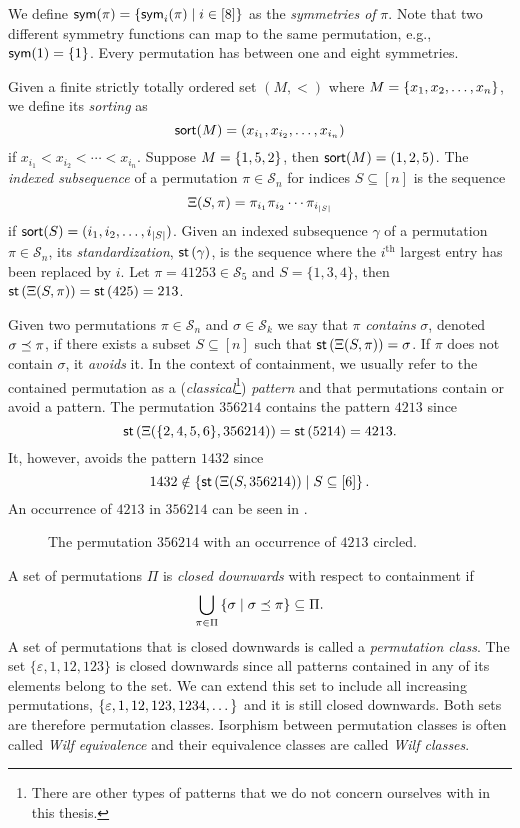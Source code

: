 We define $\textsf{sym}(\pi) = \left\{\textsf{sym}_i(\pi) \mid i \in [8]\right\}$ as the \emph{symmetries of} $\pi$. Note that two different symmetry functions can map to the same permutation, e.g., $\textsf{sym}(1) = \left\{1\right\}$. Every permutation has between one and eight symmetries.

Given a finite strictly totally ordered set $(M, <)$ where $M = \left\{x_1,x_2,\dotsc,x_n\right\}$, we define its \emph{sorting} as
\[
    \textsf{sort}(M) = (x_{i_1},x_{i_2},\dotsc,x_{i_n})
\]
if $x_{i_1} < x_{i_2} < \dotsm < x_{i_n}$. Suppose $M=\left\{1,5,2\right\}$, then $\textsf{sort}(M) = (1,2,5)$. The \emph{indexed subsequence} of a permutation $\pi \in \mathcal{S}_n$ for indices $S\subseteq [n]$ is the sequence
\[
    \Xi(S,\pi)=\pi_{i_1} \pi_{i_2} \dotsm \pi_{i_{|S|}}
\]
if $\textsf{sort}(S) = (i_1,i_2,\dotsc,i_{|S|})$. Given an indexed subsequence $\gamma$ of a permutation $\pi \in \mathcal{S}_n$, its \emph{standardization}, $\textsf{st}\left(\gamma\right)$, is the sequence where the $i^\text{th}$ largest entry has been replaced by $i$. Let $\pi = 41253 \in \mathcal{S}_5$ and $S=\{1,3,4\}$, then $\textsf{st}\left(\Xi(S,\pi)\right) = \textsf{st}\left(425\right) = 213$.

Given two permutations $\pi \in \mathcal{S}_n$ and $\sigma \in \mathcal{S}_k$ we say that $\pi$ \emph{contains} $\sigma$, denoted $\sigma \preceq \pi$, if there exists a subset $S \subseteq [n]$ such that $\textsf{st}\left(\Xi(S,\pi)\right) = \sigma$. If $\pi$ does not contain $\sigma$, it \emph{avoids} it. In the context of containment, we usually refer to the contained permutation as a (\emph{classical}\footnote{There are other types of patterns that we do not concern ourselves with in this thesis.}) \emph{pattern} and that permutations contain or avoid a pattern. The permutation $356214$ contains the pattern $4213$ since
\[
    \textsf{st}\left(\Xi(\{2, 4, 5, 6\},356214)\right) = \textsf{st}\left(5214\right) = 4213.
\]
It, however, avoids the pattern $1432$ since
\[
    1432 \notin \left\{\textsf{st}\left(\Xi(S,356214)\right) \mid S \subseteq [6]\right\}.
\]
An occurrence of $4213$ in $356214$ can be seen in .

\begin{figure}[ht!]
    \centering
    
    \caption{The permutation $356214$ with an occurrence of $4213$ circled.}
    \label{fig:pattern_containment}
\end{figure}

A set of permutations $\Pi$ is \emph{closed downwards} with respect to containment if 
\[
    \bigcup_{\pi \in \Pi}\left\{\sigma \mid \sigma \preceq \pi\right\} \subseteq \Pi.
\]
A set of permutations that is closed downwards is called a \emph{permutation class}. The set $\{\varepsilon, 1, 12, 123\}$ is closed downwards since all patterns contained in any of its elements belong to the set. We can extend this set to include all increasing permutations, $\left\{\varepsilon, 1, 12, 123, 1234, \dotsc\right\}$ and it is still closed downwards. Both sets are therefore permutation classes. Isorphism between permutation classes is often called \emph{Wilf equivalence} and their equivalence classes are called \emph{Wilf classes}. 

